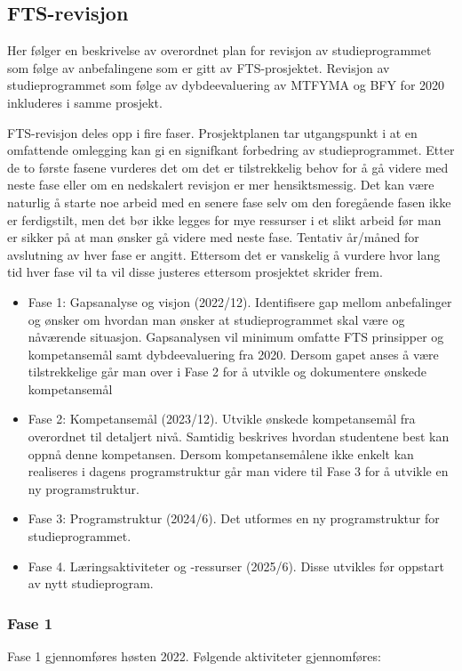 \subsection{FTS-revisjon}
Her følger en beskrivelse av overordnet plan for revisjon av studieprogrammet som følge av anbefalingene som er gitt av FTS-prosjektet. Revisjon av studieprogrammet som følge av dybdeevaluering av MTFYMA og BFY for 2020 inkluderes i samme prosjekt.

FTS-revisjon deles opp i fire faser. Prosjektplanen tar utgangspunkt i at en omfattende omlegging kan gi en signifkant forbedring av studieprogrammet. Etter de to første fasene vurderes det om det er tilstrekkelig behov for å gå videre med neste fase eller om en nedskalert revisjon er mer hensiktsmessig. Det kan være naturlig å starte noe arbeid med en senere fase selv om den foregående fasen ikke er ferdigstilt, men det bør ikke legges for mye ressurser i et slikt arbeid før man er sikker på at man ønsker gå videre med neste fase. Tentativ år/måned for avslutning av hver fase er angitt. Ettersom det er vanskelig å vurdere hvor lang tid hver fase vil ta vil disse justeres ettersom prosjektet skrider frem.

\begin{itemize}
	\item Fase 1: Gapsanalyse og visjon (2022/12). Identifisere gap mellom anbefalinger og ønsker om hvordan man ønsker at studieprogrammet skal være og nåværende situasjon. Gapsanalysen vil minimum omfatte FTS prinsipper og kompetansemål samt dybdeevaluering fra 2020. Dersom gapet anses å være tilstrekkelige går man over i Fase 2 for å utvikle og dokumentere ønskede kompetansemål
	\item Fase 2: Kompetansemål (2023/12). Utvikle ønskede kompetansemål fra overordnet til detaljert nivå. Samtidig beskrives hvordan studentene best kan oppnå denne kompetansen. Dersom kompetansemålene ikke enkelt kan realiseres i dagens programstruktur går man videre til Fase 3 for å utvikle en ny programstruktur.
	\item Fase 3: Programstruktur (2024/6). Det utformes en ny programstruktur for studieprogrammet.
	\item Fase 4. Læringsaktiviteter og -ressurser (2025/6). Disse utvikles før oppstart av nytt studieprogram.
\end{itemize}

\subsubsection{Fase 1}
Fase 1 gjennomføres høsten 2022. Følgende aktiviteter gjennomføres:

